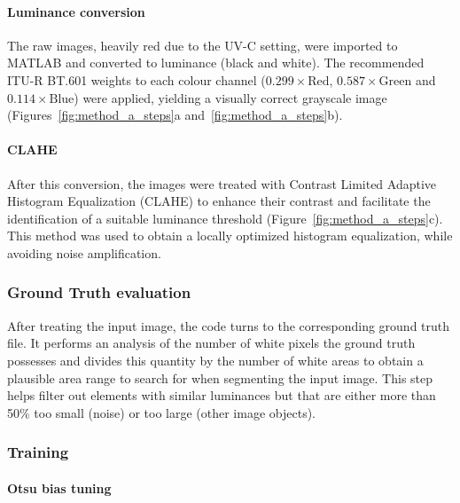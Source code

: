 \paragraph{Luminance conversion}

The raw images, heavily red due to the UV-C setting, were imported to MATLAB and converted to luminance (black and white). The recommended ITU-R BT.601 weights to each colour channel (\(0.299 \times \text{Red}\), \(0.587 \times \text{Green}\) and \(0.114 \times \text{Blue}\)) were applied, yielding a visually correct grayscale image (Figures~\ref{fig:method_a_steps}a and~\ref{fig:method_a_steps}b).

\paragraph{CLAHE}

After this conversion, the images were treated with Contrast Limited Adaptive Histogram Equalization (CLAHE) \cite{zuiderveld1994contrast} to enhance their contrast and facilitate the identification of a suitable luminance threshold (Figure~\ref{fig:method_a_steps}c). This method was used to obtain a locally optimized histogram equalization, while avoiding noise amplification.

\subsubsection{Ground Truth evaluation}

After treating the input image, the code turns to the corresponding ground truth file. It performs an analysis of the number of white pixels the ground truth possesses and divides this quantity by the number of white areas to obtain a plausible area range to search for when segmenting the input image. This step helps filter out elements with similar luminances but that are either more than 50\% too small (noise) or too large (other image objects).

\subsubsection{Training}

\paragraph{Otsu bias tuning}

